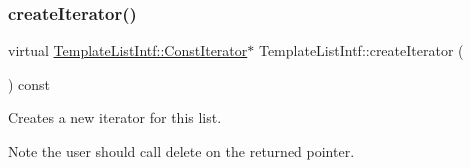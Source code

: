 \subsubsection{\texorpdfstring{createIterator()}{createIterator()}}
{\footnotesize\ttfamily virtual \mbox{\hyperlink{class_template_list_intf_1_1_const_iterator}{Template\+List\+Intf\+::\+Const\+Iterator}}$\ast$ Template\+List\+Intf\+::create\+Iterator (\begin{DoxyParamCaption}{ }\end{DoxyParamCaption}) const\hspace{0.3cm}{\ttfamily [pure virtual]}}

Creates a new iterator for this list. \begin{DoxyNote}{Note}
the user should call delete on the returned pointer. 
\end{DoxyNote}


